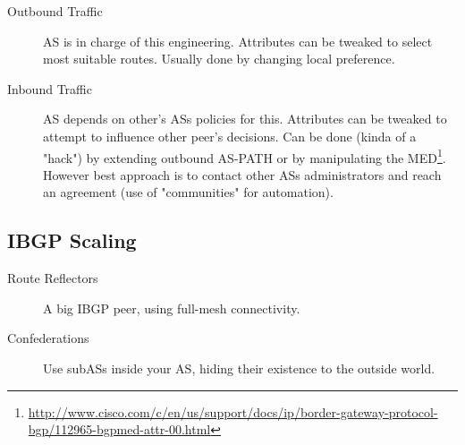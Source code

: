 \documentclass{article}
\begin{document}
\begin{description}
	\item[Outbound Traffic] AS is in charge of this engineering. Attributes can be tweaked to select most suitable routes. Usually done by changing local preference.
	\item[Inbound Traffic] AS depends on other's ASs policies for this. Attributes can be tweaked to attempt to influence other peer's decisions. Can be done (kinda of a "hack") by extending outbound AS-PATH or by manipulating the MED\footnote{\url{http://www.cisco.com/c/en/us/support/docs/ip/border-gateway-protocol-bgp/112965-bgpmed-attr-00.html}}. However best approach is to contact other ASs administrators and reach an agreement (use of "communities" for automation).
\end{description}



\subsection{IBGP Scaling}	

\begin{description}
	\item[Route Reflectors] A big IBGP peer, using full-mesh connectivity.
	\item[Confederations] Use subASs inside your AS, hiding their existence to the outside world.
\end{description}
	
\newpage


\printbibliography
\end{document}
